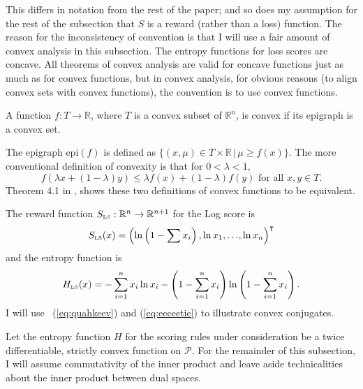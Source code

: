 \documentclass[12pt]{article}
\begin{document}
This differs in notation from the rest of the paper; and so does my
assumption for the rest of the subsection that $S$ is a reward (rather
than a loss) function. The reason for the inconsistency of convention
is that I will use a fair amount of convex analysis in this
subsection. The entropy functions for loss scores are concave. All
theorems of convex analysis are valid for concave functions just as
much as for convex functions, but in convex analysis, for obvious
reasons (to align convex sets with convex functions), the convention
is to use convex functions.

\begin{definition}
  \label{def:ongiepee}
  A function $f:T\rightarrow\mathbb{R}$, where $T$ is a convex subset
  of $\mathbb{R}^{n}$, is convex if its epigraph is a convex set.
\end{definition}

The epigraph $\mbox{epi}(f)$ is defined as
$\{(x,\mu)\in{}T\times\mathbb{R}\,\vert\,\mu\geq{}f(x)\}$. The more
conventional definition of convexity is that for $0<\lambda<1$,
\begin{equation}
  \label{eq:iamahquo}
  f(\lambda{}x+(1-\lambda)y)\leq\lambda{}f(x)+(1-\lambda)f(y)\mbox{ for all }x,y\in{}T.
\end{equation}
Theorem 4.1 in , shows these two
definitions of convex functions to be equivalent.

The reward function
$S_{\mbox{\tiny LS}}:\mathbb{R}^{n}\rightarrow\mathbb{R}^{n+1}$ for the Log
score is
\begin{equation}
  \label{eq:quahkeev}
  S_{\mbox{\tiny LS}}(x)=\left(\ln\left(1-\sum{}x_{i}\right),\ln{}x_{1},{\ldots},\ln{}x_{n}\right)^{\intercal}
\end{equation}
and the entropy function is
\begin{equation}
  \label{eq:eeceetie}
  H_{\mbox{\tiny LS}}(x)=-\sum_{i=1}^{n}x_{i}\ln{}x_{i}-\left(1-\sum_{i=1}^{n}x_{i}\right)\ln\left(1-\sum_{i=1}^{n}x_{i}\right).
\end{equation}
I will use {\quations}~(\ref{eq:quahkeev}) and (\ref{eq:eeceetie}) to
illustrate convex conjugates.

Let the entropy function $H$ for the scoring rules under consideration
be a twice differentiable, strictly convex function on $\mathcal{P}$.
For the remainder of this subsection, I will assume commutativity of
the inner product and leave aside technicalities about the inner
product between dual spaces.
\end{document}
